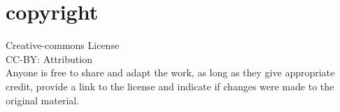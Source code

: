 \chapter*{copyright}

\vspace{4in}

Creative-commons License \\
CC-BY: Attribution \\
Anyone is free to share and adapt the work, as long as they give appropriate credit, provide a link to the license and indicate if changes were made to the original material.